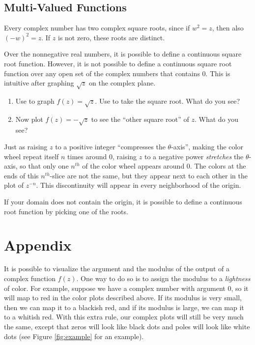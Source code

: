 \subsection*{Multi-Valued Functions}
Every complex number has two complex square roots, since if $w^2=z$, then also $(-w)^2=z$.
If $z$ is not zero, these roots are distinct.

Over the nonnegative real numbers, it is possible to define a continuous square root function.
However, it is not possible to define a continuous square root function over any open set of the complex numbers that contains 0.
This is intuitive after graphing $\sqrt{z}$ on the complex plane.

\begin{problem}
\begin{enumerate}
\item Use  to graph $f(z) = \sqrt{z}$.
Use  to take the square root.
What do you see?
\item Now plot $f(z) = -\sqrt{z}$ to see the ``other square root'' of $z$. What do you see?
\end{enumerate}
\end{problem}

Just as raising $z$ to a positive integer ``compresses the $\theta$-axis'', making the color wheel repeat itself $n$ times around 0, raising $z$ to a negative power \emph{stretches} the $\theta$-axis, so that only one $n^{th}$ of the color wheel appears around 0.
The colors at the ends of this $n^{th}$-slice are not the same, but they appear next to each other in the plot of $z^{-n}$.
This discontinuity will appear in every neighborhood of the origin. 


If your domain does not contain the origin, it is possible to define a continuous root function by picking one of the roots.


\section*{Appendix}
It is possible to visualize the argument and the modulus of the output of a complex function $f(z)$. 
One way to do so is to assign the modulus to a \emph{lightness} of color.
For example, suppose we have a complex number with argument 0, so it will map to red in the color plots described above.
If its modulus is very small, then we can map it to a blackish red, and if its modulus is large, we can map it to a whitish red.
With this extra rule, our complex plots will still be very much the same, except that zeros will look like black dots and poles will look like white dots (see Figure \ref{fig:example} for an example).

